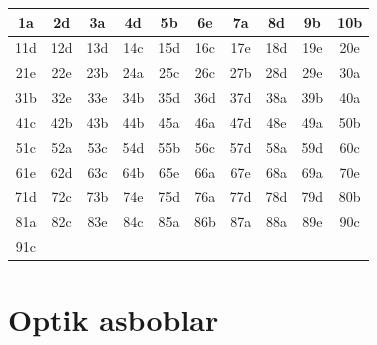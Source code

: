 \begin{center}
\renewcommand{\arraystretch}{1.3}
\begin{tabular}{|c|c|c|c|c|c|c|c|c|c|}
\hline
1a & 2d & 3a & 4d & 5b & 6e & 7a & 8d & 9b & 10b \\
\hline
11d & 12d & 13d & 14c & 15d & 16c & 17e & 18d & 19e & 20e \\
\hline
21e & 22e & 23b & 24a & 25c & 26c & 27b & 28d & 29e & 30a \\
\hline
31b & 32e & 33e & 34b & 35d & 36d & 37d & 38a & 39b & 40a \\
\hline
41c & 42b & 43b & 44b & 45a & 46a & 47d & 48e & 49a & 50b \\
\hline
51c & 52a & 53c & 54d & 55b & 56c & 57d & 58a & 59d & 60c \\
\hline
61e & 62d & 63c & 64b & 65e & 66a & 67e & 68a & 69a & 70e \\
\hline
71d & 72c & 73b & 74e & 75d & 76a & 77d & 78d & 79d & 80b \\
\hline
81a & 82c & 83e & 84c & 85a & 86b & 87a & 88a & 89e & 90c \\
\hline
91c & & & & & & & & & \\
\hline
\end{tabular}
\end{center}














\section{Optik asboblar}

